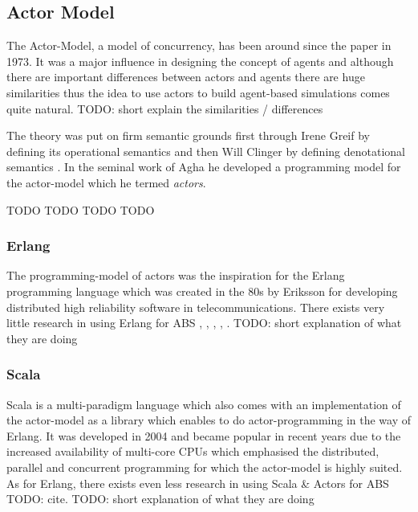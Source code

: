 \subsection{Actor Model}
The Actor-Model, a model of concurrency, has been around since the paper \cite{hewitt_universal_1973} in 1973. It was a major influence in designing the concept of agents and although there are important differences between actors and agents there are huge similarities thus the idea to use actors to build agent-based simulations comes quite natural. TODO: short explain the similarities / differences

The theory was put on firm semantic grounds first through Irene Greif by defining its operational semantics \cite{greif_semantics_1975} and then Will Clinger by defining denotational semantics \cite{clinger_foundations_1981}. In the seminal work of Agha \cite{agha_actors:_1986} he developed a programming model for the actor-model which he termed \textit{actors}.

TODO \cite{agha_foundation_1997}
TODO \cite{hewitt_what_2007}
TODO \cite{hewitt_actor_2010}
TODO \cite{agha_algebraic_2004}

\subsubsection{Erlang}
The programming-model of actors \cite{agha_actors:_1986} was the inspiration for the Erlang programming language which was created in the 80s by Eriksson for developing distributed high reliability software in telecommunications. There exists very little research in using Erlang for ABS \cite{varela_modelling_2004}, \cite{di_stefano_using_2005}, \cite{di_stefano_exat:_2007}, \cite{sher_agent-based_2013}, \cite{Bezirgiannis2013}. TODO: short explanation of what they are doing

\subsubsection{Scala}
Scala is a multi-paradigm language which also comes with an implementation of the actor-model as a library which enables to do actor-programming in the way of Erlang. It was developed in 2004 and became popular in recent years due to the increased availability of multi-core CPUs which emphasised the distributed, parallel and concurrent programming for which the actor-model is highly suited.
As for Erlang, there exists even less research in using Scala \& Actors for ABS TODO: cite.  TODO: short explanation of what they are doing